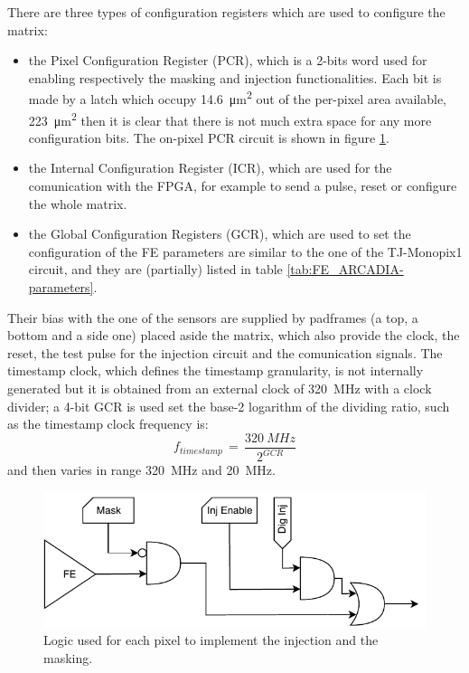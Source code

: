         There are three types of configuration registers which are used to configure the matrix: 
        \begin{itemize}
            \item the Pixel Configuration Register (PCR), which is a 2-bits word used for enabling respectively the masking and injection functionalities. Each bit is made by a latch which occupy \SI{14.6}{\um\squared} out of the per-pixel area available, \SI{223}{\um\squared} then it is clear that there is not much extra space for any more configuration bits. The on-pixel PCR circuit is shown in figure \ref{fig:pixel_cfg}.
            \item the Internal Configuration Register (ICR), which are used for the comunication with the FPGA, for example to send a pulse, reset or configure the whole matrix.
            \item the Global Configuration Registers (GCR), which are used to set the configuration of the FE parameters are similar to the one of the TJ-Monopix1 circuit, and they are (partially) listed in table \ref{tab:FE_ARCADIA-parameters}.
        \end{itemize}
        Their bias with the one of the sensors are supplied by padframes (a top, a bottom and a side one) placed aside the matrix, which also provide the clock, the reset, the test pulse for the injection circuit and the comunication signals.
        The timestamp clock, which defines the timestamp granularity, is not internally generated but it is obtained from an external clock of \SI{320}{MHz} with a clock divider; a 4-bit GCR is used set the base-2 logarithm of the dividing ratio, such as the timestamp clock frequency is:
        \begin{equation}
            f_{timestamp}\, =\, \frac{\SI{320}{MHz}}{2^{GCR}}
        \end{equation}
        and then varies in range \SI{320}{MHz} and \SI{20}{MHz}.\\
        \begin{figure}[h!]
            \centering
            \includegraphics[width=.7\linewidth]{figures/ARCADIA/pixel_cfg.pdf}
            \caption{Logic used for each pixel to implement the injection and the masking.}
            \label{fig:pixel_cfg}
        \end{figure}    
